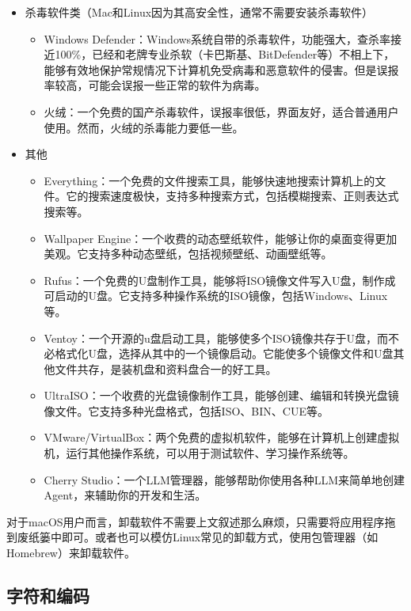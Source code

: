 \documentclass[../main.tex]{subfiles}
\begin{document}
\begin{itemize}
\begin{itemize}
    \end{itemize}
  \item 杀毒软件类（Mac和Linux因为其高安全性，通常不需要安装杀毒软件）
    \begin{itemize}
      \item Windows Defender：Windows系统自带的杀毒软件，功能强大，查杀率接近100\%，已经和老牌专业杀软（卡巴斯基、BitDefender等）不相上下，能够有效地保护常规情况下计算机免受病毒和恶意软件的侵害。但是误报率较高，可能会误报一些正常的软件为病毒。
      \item 火绒：一个免费的国产杀毒软件，误报率很低，界面友好，适合普通用户使用。然而，火绒的杀毒能力要低一些。
    \end{itemize}
  \item 其他
    \begin{itemize}
      \item Everything：一个免费的文件搜索工具，能够快速地搜索计算机上的文件。它的搜索速度极快，支持多种搜索方式，包括模糊搜索、正则表达式搜索等。
      \item Wallpaper Engine：一个收费的动态壁纸软件，能够让你的桌面变得更加美观。它支持多种动态壁纸，包括视频壁纸、动画壁纸等。
      \item Rufus：一个免费的U盘制作工具，能够将ISO镜像文件写入U盘，制作成可启动的U盘。它支持多种操作系统的ISO镜像，包括Windows、Linux等。
      \item Ventoy：一个开源的u盘启动工具，能够使多个ISO镜像共存于U盘，而不必格式化U盘，选择从其中的一个镜像启动。它能使多个镜像文件和U盘其他文件共存，是装机盘和资料盘合一的好工具。
      \item UltraISO：一个收费的光盘镜像制作工具，能够创建、编辑和转换光盘镜像文件。它支持多种光盘格式，包括ISO、BIN、CUE等。
      \item VMware/VirtualBox：两个免费的虚拟机软件，能够在计算机上创建虚拟机，运行其他操作系统，可以用于测试软件、学习操作系统等。
      \item Cherry Studio：一个LLM管理器，能够帮助你使用各种LLM来简单地创建Agent，来辅助你的开发和生活。
    \end{itemize}
\end{itemize}

\begin{tip}
对于macOS用户而言，卸载软件不需要上文叙述那么麻烦，只需要将应用程序拖到废纸篓中即可。或者也可以模仿Linux常见的卸载方式，使用包管理器（如Homebrew）来卸载软件。
\end{tip}

\subsection{字符和编码}\label{sec:locale}
\end{document}
